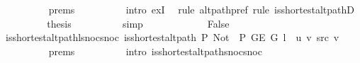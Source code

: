 \begin{isabellebody}
\ \ \ \ \ \ \ \ \isamarkupfalse%
\ {\isachardoublequoteopen}{}{\isachardot}{\kern0pt}prems{\isachardoublequoteclose}{\isacharparenleft}{\kern0pt}{}{\isacharparenright}{\kern0pt}\isanewline
\ \ \ \ \ \ \ \ \isamarkupfalse%
\ {\isacharparenleft}{\kern0pt}intro\ exI{\isacharparenright}{\kern0pt}\ \isamarkupfalse%
\ {\isacharparenleft}{\kern0pt}rule\ alt{\isacharunderscore}{\kern0pt}path{\isacharunderscore}{\kern0pt}pref{\isacharparenright}{\kern0pt}\ {\isacharparenleft}{\kern0pt}rule\ is{\isacharunderscore}{\kern0pt}shortest{\isacharunderscore}{\kern0pt}alt{\isacharunderscore}{\kern0pt}pathD{\isacharparenleft}{\kern0pt}{}{\isacharparenright}{\kern0pt}{\isacharparenright}{\kern0pt}\isanewline
\ \ \ \ \ \ \isamarkupfalse%
\ \isamarkupfalse%
\ {\isacharquery}{\kern0pt}thesis\isanewline
\ \ \ \ \ \ \ \ \isamarkupfalse%
\ simp\isanewline
\ \ \ \ \isamarkupfalse%
\isanewline
\ \ \ \ \ \ \isamarkupfalse%
\ False\isanewline
\ \ \ \ \ \ \isamarkupfalse%
\ is{\isacharunderscore}{\kern0pt}shortest{\isacharunderscore}{\kern0pt}alt{\isacharunderscore}{\kern0pt}path{\isacharunderscore}{\kern0pt}l{\isacharunderscore}{\kern0pt}snoc{\isacharunderscore}{\kern0pt}snoc{\isacharcolon}{\kern0pt}\ {\isachardoublequoteopen}is{\isacharunderscore}{\kern0pt}shortest{\isacharunderscore}{\kern0pt}alt{\isacharunderscore}{\kern0pt}path\ P{\isacharprime}{\kern0pt}{\isacharprime}{\kern0pt}\ {\isacharparenleft}{\kern0pt}Not\ {\isasymcirc}\ P{\isacharprime}{\kern0pt}{\isacharprime}{\kern0pt}{\isacharparenright}{\kern0pt}\ {\isacharparenleft}{\kern0pt}G{\isachardot}{\kern0pt}E\ G{\isacharparenright}{\kern0pt}\ {\isacharparenleft}{\kern0pt}l\ {\isacharat}{\kern0pt}\ {\isacharbrackleft}{\kern0pt}u{\isacharcomma}{\kern0pt}\ v{\isacharbrackright}{\kern0pt}{\isacharparenright}{\kern0pt}\ src\ v{\isachardoublequoteclose}\isanewline
\ \ \ \ \ \ \ \ \isamarkupfalse%
\ {\isachardoublequoteopen}{}{\isachardot}{\kern0pt}prems{\isachardoublequoteclose}{\isacharparenleft}{\kern0pt}{}{\isacharparenright}{\kern0pt}\isanewline
\ \ \ \ \ \ \ \ \isamarkupfalse%
\ {\isacharparenleft}{\kern0pt}intro\ is{\isacharunderscore}{\kern0pt}shortest{\isacharunderscore}{\kern0pt}alt{\isacharunderscore}{\kern0pt}path{\isacharunderscore}{\kern0pt}snoc{\isacharunderscore}{\kern0pt}snoc{\isacharparenright}{\kern0pt}\isanewline
\ \ \ \ \ \ \isamarkupfalse%

\end{isabellebody}
